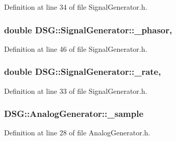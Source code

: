 Definition at line 34 of file Signal\+Generator.\+h.

\hypertarget{classDSG_1_1SignalGenerator_ac2271b582bf699275f077ecb642a8cd9}{
\subsubsection[{\+\_\+phasor}]{\setlength{\rightskip}{0pt plus 5cm}double D\+S\+G\+::\+Signal\+Generator\+::\+\_\+phasor\hspace{0.3cm}{\ttfamily [protected]}, {\ttfamily [inherited]}}}\label{classDSG_1_1SignalGenerator_ac2271b582bf699275f077ecb642a8cd9}


Definition at line 46 of file Signal\+Generator.\+h.

\hypertarget{classDSG_1_1SignalGenerator_aa10f6c85d9adee901139ea7fb346f39d}{
\subsubsection[{\+\_\+rate}]{\setlength{\rightskip}{0pt plus 5cm}double D\+S\+G\+::\+Signal\+Generator\+::\+\_\+rate\hspace{0.3cm}{\ttfamily [protected]}, {\ttfamily [inherited]}}}\label{classDSG_1_1SignalGenerator_aa10f6c85d9adee901139ea7fb346f39d}


Definition at line 33 of file Signal\+Generator.\+h.

\hypertarget{classDSG_1_1AnalogGenerator_ac88ad591cac37f636c2f7b460480bef9}{
\subsubsection[{\+\_\+sample}]{ D\+S\+G\+::\+Analog\+Generator\+::\+\_\+sample\hspace{0.3cm}{\ttfamily [protected]}}}\label{classDSG_1_1AnalogGenerator_ac88ad591cac37f636c2f7b460480bef9}


Definition at line 28 of file Analog\+Generator.\+h.




